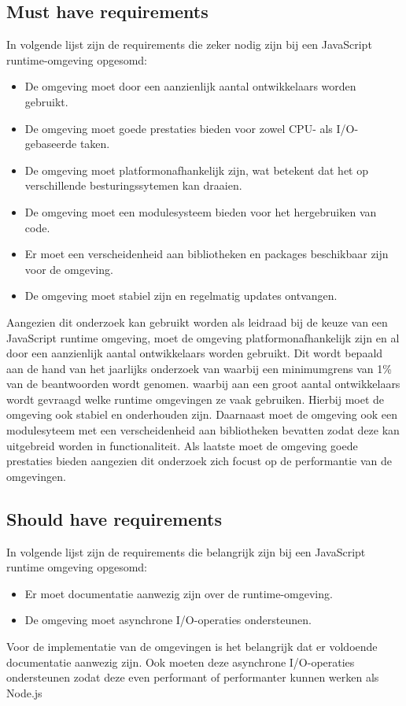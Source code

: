 \subsection{Must have requirements}
In volgende lijst zijn de requirements die zeker nodig zijn bij een JavaScript runtime-omgeving opgesomd:
\begin{itemize}
    \item De omgeving moet door een aanzienlijk aantal ontwikkelaars worden gebruikt.
    \item De omgeving moet goede prestaties bieden voor zowel CPU- als I/O-gebaseerde taken.
    \item De omgeving moet platformonafhankelijk zijn, wat betekent dat het op verschillende besturingssytemen kan draaien.
    \item De omgeving moet een modulesysteem bieden voor het hergebruiken van code.
    \item Er moet een verscheidenheid aan bibliotheken en packages beschikbaar zijn voor de omgeving.
    \item De omgeving moet stabiel zijn en regelmatig updates ontvangen.
\end{itemize}
Aangezien dit onderzoek kan gebruikt worden als leidraad bij de keuze van een JavaScript runtime omgeving, 
moet de omgeving platformonafhankelijk zijn en al door een aanzienlijk aantal ontwikkelaars worden gebruikt.
Dit wordt bepaald aan de hand van het jaarlijks onderzoek van \textcite{Greif2022} 
waarbij een minimumgrens van 1\% van de beantwoorden wordt genomen.
waarbij aan een groot aantal ontwikkelaars wordt gevraagd welke runtime omgevingen ze vaak gebruiken.
Hierbij moet de omgeving ook stabiel en onderhouden zijn.
Daarnaast moet de omgeving ook een modulesyteem met een verscheidenheid aan bibliotheken bevatten 
zodat deze kan uitgebreid worden in functionaliteit. 
Als laatste moet de omgeving goede prestaties bieden aangezien dit onderzoek zich focust op de performantie van de omgevingen.

\subsection{Should have requirements}
In volgende lijst zijn de requirements die belangrijk zijn bij een JavaScript runtime omgeving opgesomd:
\begin{itemize}
    \item Er moet documentatie aanwezig zijn over de runtime-omgeving.
    \item De omgeving moet asynchrone I/O-operaties ondersteunen.
\end{itemize}
Voor de implementatie van de omgevingen is het belangrijk dat er voldoende documentatie aanwezig zijn.
Ook moeten deze asynchrone I/O-operaties ondersteunen zodat deze even performant of performanter kunnen werken als Node.js

